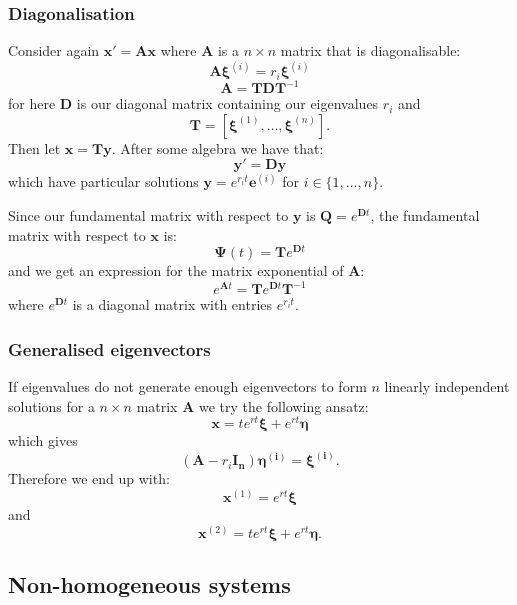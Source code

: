 \documentclass{article}
\newcommand{\matr}[1]{\mathbf{#1}}
\begin{document}
\newpage

\subsubsection{Diagonalisation}
Consider again $\boldsymbol{x}'
=\boldsymbol{A}\boldsymbol{x}$ where
$\boldsymbol{A}$ is a $n \times n$ matrix
that is diagonalisable:
$$\boldsymbol{A}\boldsymbol{\xi}^{(i)}
=r_i\boldsymbol{\xi}^{(i)}$$
$$\boldsymbol{A}=\boldsymbol{T}
\boldsymbol{D}\boldsymbol{T}^{-1}$$
for here $\boldsymbol{D}$ is our diagonal matrix
containing our eigenvalues $r_i$ and
$$\boldsymbol{T}
=[\boldsymbol{\xi}^{(1)},\dots
,\boldsymbol{\xi}^{(n)}].$$
Then let $\boldsymbol{x}=\boldsymbol{T}
\boldsymbol{y}$. After some algebra we have that:
$$\boldsymbol{y}'=\boldsymbol{D}\boldsymbol{y}$$
which have particular solutions
$\boldsymbol{y}=e^{r_i t}\boldsymbol{e}^{(i)}$
for $i\in\{1,\dots,n\}$.

Since our fundamental matrix with respect to
$\boldsymbol{y}$ is
$\boldsymbol{Q}=e^{\boldsymbol{D}t}$,
the fundamental matrix with respect to
$\boldsymbol{x}$ is:
$$\boldsymbol{\Psi}(t)
=\boldsymbol{T}e^{\boldsymbol{D}t}$$
and we get an expression for the matrix exponential
of $\boldsymbol{A}$:
$$e^{\boldsymbol{A}t}=\boldsymbol{T}
e^{\boldsymbol{D}t}\boldsymbol{T}^{-1}$$
where $e^{\boldsymbol{D}t}$ is a diagonal matrix
with entries $e^{r_i t}$.

\subsubsection{Generalised eigenvectors}
If eigenvalues do not generate enough eigenvectors to
form $n$ linearly independent solutions for a
$n\times n$ matrix $\boldsymbol{A}$ we try the following ansatz:
$$\boldsymbol{x}=te^{rt} \boldsymbol{\xi}+e^{rt} \boldsymbol{\eta}$$
which gives
$$(\matr{A}-r_i \matr{I_n})\boldsymbol{\eta^{(i)}}=\boldsymbol{\xi^{(i)}}.$$
Therefore we end up with:
$$\boldsymbol{x}^{(1)}=e^{rt}\boldsymbol{\xi}$$
and
$$\boldsymbol{x}^{(2)}
=te^{rt} \boldsymbol{\xi}+e^{rt} \boldsymbol{\eta}.$$

\newpage
    
\subsection{Non-homogeneous systems}
\end{document}
